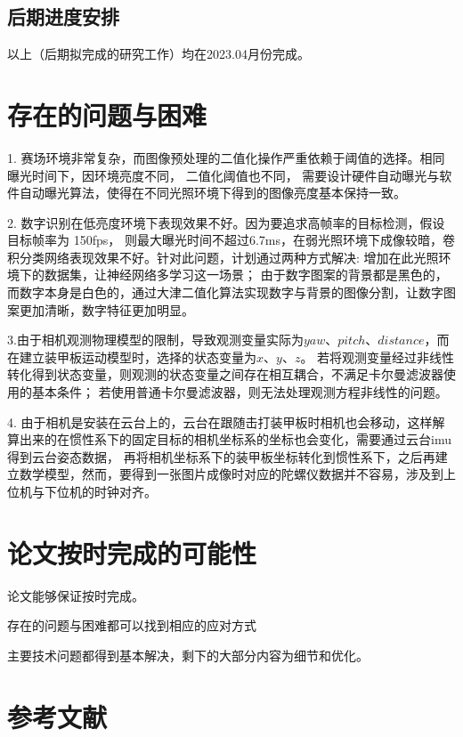 \subsection{后期进度安排}
以上（后期拟完成的研究工作）均在2023.04月份完成。
\section{存在的问题与困难}
1. 赛场环境非常复杂，而图像预处理的二值化操作严重依赖于阈值的选择。相同曝光时间下，因环境亮度不同， 二值化阈值也不同，
需要设计硬件自动曝光与软件自动曝光算法，使得在不同光照环境下得到的图像亮度基本保持一致。\par
2. 数字识别在低亮度环境下表现效果不好。因为要追求高帧率的目标检测，假设目标帧率为 150fps，
则最大曝光时间不超过6.7ms，在弱光照环境下成像较暗，卷积分类网络表现效果不好。针对此问题，计划通过两种方式解决:
增加在此光照环境下的数据集，让神经网络多学习这一场景；
由于数字图案的背景都是黑色的，而数字本身是白色的，通过大津二值化算法实现数字与背景的图像分割，让数字图案更加清晰，数字特征更加明显。\par
3.由于相机观测物理模型的限制，导致观测变量实际为$yaw$、$pitch$、$distance$，而在建立装甲板运动模型时，选择的状态变量为$x$、$y$、$z$。
若将观测变量经过非线性转化得到状态变量，则观测的状态变量之间存在相互耦合，不满足卡尔曼滤波器使用的基本条件；
若使用普通卡尔曼滤波器，则无法处理观测方程非线性的问题。\par
4. 由于相机是安装在云台上的，云台在跟随击打装甲板时相机也会移动，这样解算出来的在惯性系下的固定目标的相机坐标系的坐标也会变化，需要通过云台imu得到云台姿态数据，
再将相机坐标系下的装甲板坐标转化到惯性系下，之后再建立数学模型，然而，要得到一张图片成像时对应的陀螺仪数据并不容易，涉及到上位机与下位机的时钟对齐。
\section{论文按时完成的可能性}
论文能够保证按时完成。\par
存在的问题与困难都可以找到相应的应对方式\par
主要技术问题都得到基本解决，剩下的大部分内容为细节和优化。\par

\section{参考文献}



